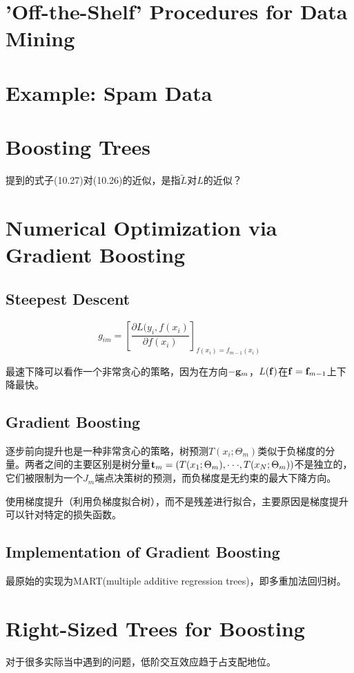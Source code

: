     \section{'Off-the-Shelf' Procedures for Data Mining}
    \section{Example: Spam Data}
    \section{Boosting Trees}
        提到的式子(10.27)对(10.26)的近似，是指$\tilde L$对$L$的近似？
    \section{Numerical Optimization via Gradient Boosting}
        \subsection{Steepest Descent}
            \begin{equation}
              {g_{im}} = {\left[ {\frac{{\partial L({y_i},f({x_i})}}{{\partial f({x_i})}}} \right]_{f({x_i}) = {f_{m - 1}}({x_i})}}
            \end{equation}

            最速下降可以看作一个非常贪心的策略，因为在方向$- {{\bf{g}}_m}$，$L({\bf{f}})$在${\bf{f}} = {{\bf{f}}_{m - 1}}$上下降最快。
        \subsection{Gradient Boosting}
            逐步前向提升也是一种非常贪心的策略，树预测$T({x_i};{\Theta _m})$类似于负梯度的分量。两者之间的主要区别是树分量${{\bf{t}}_m} = (T({x_1};{\Theta _m}), \cdot  \cdot  \cdot ,T({x_N};{\Theta _m}))$不是独立的，它们被限制为一个$J_m$端点决策树的预测，而负梯度是无约束的最大下降方向。

            使用梯度提升（利用负梯度拟合树），而不是残差进行拟合，主要原因是梯度提升可以针对特定的损失函数。
        \subsection{Implementation of Gradient Boosting}
            最原始的实现为MART(multiple additive regression trees)，即多重加法回归树。
    \section{Right-Sized Trees for Boosting}
        对于很多实际当中遇到的问题，低阶交互效应趋于占支配地位。

